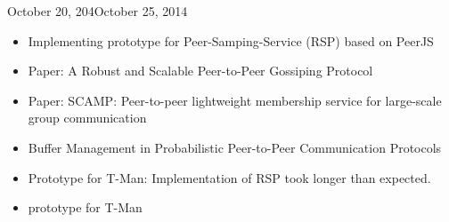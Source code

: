 \documentclass[11pt, english, screen]{report-rd-info}
\begin{document}
\begin{fichesuivi}{October 20, 204}{October 25, 2014}

   \begin{travaileffectue}
      \begin{itemize}
          \item {Implementing prototype for Peer-Samping-Service (RSP) based on PeerJS}
   \item {Paper: A Robust and Scalable Peer-to-Peer Gossiping Protocol}
   \item {Paper: SCAMP: Peer-to-peer lightweight membership service for large-scale group communication}
   \item{Buffer Management in Probabilistic Peer-to-Peer Communication Protocols}
     \end{itemize}
   \end{travaileffectue}

   \begin{travailnoneffectue}
       \begin{itemize}
           \item{Prototype for T-Man: Implementation of RSP took longer than expected. }
        \end{itemize}
   \end{travailnoneffectue}

   \begin{echange}
   \end{echange}

   \begin{planification}
      \begin{itemize}
   \item {prototype for T-Man}
     \end{itemize}
   \end{planification}
\end{fichesuivi}
\end{document}
